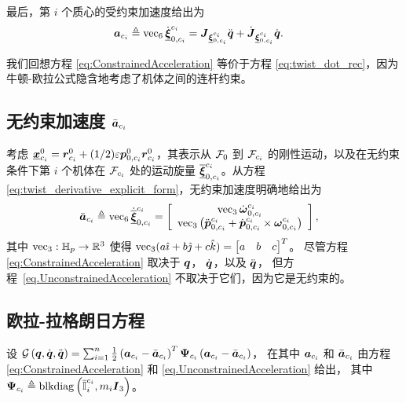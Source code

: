 最后，第 $i$ 个质心的受约束加速度给出为
\begin{align}
\boldsymbol{a}_{c_{i}} & \triangleq\operatorname{vec}_{6}\dot{\underline{\boldsymbol{\xi}}}_{0,c_{i}}^{c_{i}}=\boldsymbol{J}_{\underline{\boldsymbol{\xi}}_{0,c_{i}}^{c_{i}}}\ddot{\boldsymbol{q}}+\dot{\boldsymbol{J}}_{\underline{\boldsymbol{\xi}}_{0,c_{i}}^{c_{i}}}\dot{\boldsymbol{q}}.\label{eq:ConstrainedAcceleration}
\end{align}

我们回想方程 \eqref{eq:ConstrainedAcceleration} 等价于方程 \eqref{eq:twist_dot_rec}，因为牛顿-欧拉公式隐含地考虑了机体之间的连杆约束。

\subsection{\normalfont\bfseries 无约束加速度 $\bar{\protect\boldsymbol{a}}_{c_{i}}$}

考虑 $\underline{\boldsymbol{x}}_{c_{i}}^{0}=\boldsymbol{r}_{c_{i}}^{0}+(1/2)\varepsilon\boldsymbol{p}_{0,c_{i}}^{0}\boldsymbol{r}_{c_{i}}^{0}$，其表示从 $\mathcal{F}_{0}$ 到 $\mathcal{F}_{c_{i}}$ 的刚性运动，以及在无约束条件下第 $i$ 个机体在 $\mathcal{F}_{c_{i}}$ 处的运动旋量 $\overline{\underline{\boldsymbol{\xi}}}_{0,c_{i}}^{c_{i}}$。从方程 \eqref{eq:twist_derivative_explicit_form}，无约束加速度明确地给出为
\begin{align}
\bar{\boldsymbol{a}}_{c_{i}} & \triangleq\operatorname{vec}_{6}\dot{\overline{\underline{\boldsymbol{\xi}}}}_{0,c_{i}}^{c_{i}}=\left[\begin{array}{c}
\operatorname{vec}_{3}\dot{\boldsymbol{\omega}}_{0,c_{i}}^{c_{i}}\\
\operatorname{vec}_{3}\left(\ddot{\boldsymbol{p}}_{0,c_{i}}^{c_{i}}+\dot{\boldsymbol{p}}_{0,c_{i}}^{c_{i}}\times\boldsymbol{\omega}_{0,c_{i}}^{c_{i}}\right)
\end{array}\right],\label{eq.UnconstrainedAcceleration}
\end{align}
其中 $\operatorname{vec}_{3}:\mathbb{H}_{p}\to\mathbb{R}^{3}$ 使得 $\operatorname{vec}_{3}(a\hat{\imath}+b\hat{\jmath}+c\hat{k})=\begin{bmatrix}a & b & c\end{bmatrix}^{T}$。
尽管方程 \eqref{eq:ConstrainedAcceleration} 取决于 $\boldsymbol{q}$，
$\dot{\boldsymbol{q}}$，以及 $\ddot{\boldsymbol{q}}$， 但方程~\eqref{eq.UnconstrainedAcceleration} 不取决于它们，因为它是无约束的。

\subsection{\normalfont\bfseries 欧拉-拉格朗日方程\label{subsec:Euler-Lagrange-equations}}

设 $\mathcal{G}\left(\boldsymbol{q},\dot{\boldsymbol{q}},\ddot{\boldsymbol{q}}\right)=\sum_{i=1}^{n}\frac{1}{2}\left(\boldsymbol{a}_{c_{i}}-\bar{\boldsymbol{a}}_{c_{i}}\right)^{T}\boldsymbol{\Psi}_{c_{i}}\left(\boldsymbol{a}_{c_{i}}-\bar{\boldsymbol{a}}_{c_{i}}\right)$，
在其中 $\boldsymbol{a}_{c_{i}}$ 和 $\bar{\boldsymbol{a}}_{c_{i}}$ 由方程
 \eqref{eq:ConstrainedAcceleration} 和 \eqref{eq.UnconstrainedAcceleration} 给出，
其中 $\boldsymbol{\Psi}_{c_{i}}\triangleq\mathrm{blkdiag}\left(\bar{\boldsymbol{\mathbb{I}}}_{i}^{c_{i}},m_{i}\boldsymbol{I}_{3}\right)$。


